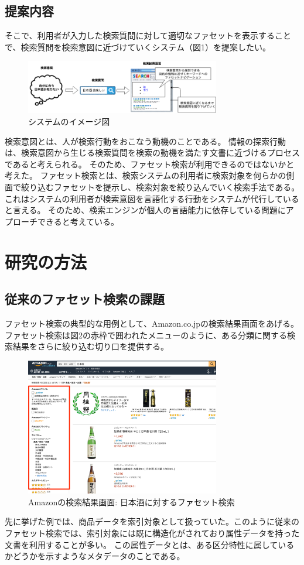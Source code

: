 \documentclass[a4j,10pt, twocolumn]{jarticle} \usepackage[dvipdfmx]{graphicx} \usepackage{amssymb} \usepackage{amsmath}
\begin{document}
\subsection{提案内容}

 そこで、利用者が入力した検索質問に対して適切なファセットを表示することで、検索質問を検索意図に近づけていくシステム（図1）を提案したい。

 \begin{figure}[ht]
   \includegraphics[width=85mm]{./new_ir_with_navi.png}
   \caption{システムのイメージ図}
 \end{figure}
 
 検索意図とは、人が検索行動をおこなう動機のことである。
 情報の探索行動は、検索意図から生じる検索質問を検索の動機を満たす文書に近づけるプロセスであると考えられる。
 そのため、ファセット検索が利用できるのではないかと考えた。
 ファセット検索とは、検索システムの利用者に検索対象を何らかの側面で絞り込むファセットを提示し、検索対象を絞り込んでいく検索手法である\cite{faceted}。
 これはシステムの利用者が検索意図を言語化する行動をシステムが代行していると言える。
 そのため、検索エンジンが個人の言語能力に依存している問題にアプローチできると考えている。
\section{研究の方法}
\subsection{従来のファセット検索の課題}
 ファセット検索の典型的な用例として、Amazon.co.jp\cite{amazon}の検索結果画面をあげる。ファセット検索は図2の赤枠で囲われたメニューのように、ある分類に関する検索結果をさらに絞り込む切り口を提供する。
 \begin{figure}[ht]
   \includegraphics[width=85mm]{./amazon.png}
   \caption{Amazonの検索結果画面: 日本酒に対するファセット検索}
 \end{figure}
  先に挙げた例では、商品データを索引対象として扱っていた。このように従来のファセット検索では、索引対象には既に構造化がされており属性データを持った文書を利用することが多い。
  この属性データとは、ある区分特性に属しているかどうかを示すようなメタデータのことである。
\end{document}
